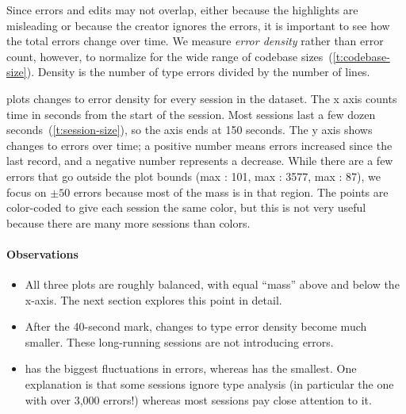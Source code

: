 \documentclass[english,submission,cleveref]{programming}
\begin{document}
Since errors and edits may not overlap, either because the highlights
are misleading or because the creator ignores the errors, it is important
to see how the total errors change over time.
We measure \emph{error density} rather than error count, however,
to normalize for the wide range of codebase sizes~(\cref{t:codebase-size}).
Density is the number of type errors divided by the number of lines.

 plots changes to error density for every session in the dataset.
The x axis counts time in seconds from the start of the session.
Most sessions last a few dozen seconds~(\cref{t:session-size}), so the axis
ends at 150 seconds.
The y axis shows changes to errors over time; a positive number means errors
increased since the last record, and a negative number represents a decrease.
While there are a few errors that go outside the plot bounds
(max \mnocheck{}: 101, max \mnonstrict{}: 3577, max \mstrict{}: 87), we focus
on $\pm{}50$ errors because most of the mass is in that region.
The points are color-coded to give each session the same color, but this is not
very useful because there are many more sessions than colors.


\paragraph{Observations}


\begin{itemize}
  \item
    All three plots are roughly balanced,
    with equal ``mass'' above and below the x-axis.
    The next section explores this point in detail.

  \item
    After the 40-second mark, changes to type error density become much
    smaller.
    These long-running sessions are not introducing errors.

  \item
    \mnonstrict{} has the biggest fluctuations in errors, whereas \mstrict{}
    has the smallest.
    One explanation is that some \mnonstrict{} sessions ignore type analysis
    (in particular the one with over 3,000 errors!) whereas most \mstrict{}
    sessions pay close attention to it.


\end{itemize}
\end{document}
